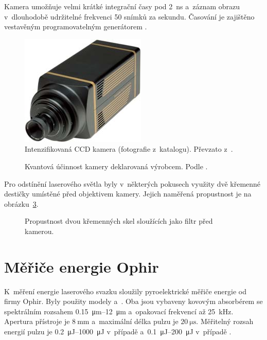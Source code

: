 Kamera umožňuje velmi krátké integrační časy pod \SI{2}{\nano\second}
a~záznam obrazu v~dlouhodobě udržitelné frekvenci 50 snímků za sekundu.
Časování je zajištěno vestavěným programovatelným generátorem .
\autocite{pimax-datasheet}

\begin{figure}[htp]
	\centering
	\includegraphics[scale=0.4]{img/pimax-1024}
	\caption{Intenzifikovaná CCD kamera 
		(fotografie z~katalogu).
		Převzato z~\cite{pimax-datasheet}.}
	\label{fig:instruments-camera}
\end{figure}

\begin{figure}[htp]
	\centering
	
	\caption{Kvantová účinnost kamery deklarovaná výrobcem.
		Podle \cite{pimax-datasheet}.}
	\label{fig:instruments-cameraeff}
\end{figure}

Pro odstínění laserového světla byly v~některých pokusech využity dvě
křemenné destičky umístěné před objektivem kamery.
Jejich naměřená propustnost je na obrázku~\ref{fig:instruments-camerafilter}.

\begin{figure}[htp]
	\centering
	
	\caption{Propustnost dvou křemenných skel sloužících jako filtr
		před kamerou.}
	\label{fig:instruments-camerafilter}
\end{figure}

\section{Měřiče energie Ophir}
\label{sec:instruments-powermeter}
K~měření energie laserového svazku sloužily pyroelektrické měřiče energie
od firmy Ophir.
Byly použity modely  a~.
Oba jsou vybaveny kovovým absorbérem se spektrálním rozsahem
\SIrange{0.15}{12}{\micro\metre}
a~opakovací frekvencí až \SI{25}{\kilo\hertz}.
Apertura přístroje je $\SI{8}{\milli\metre}$
a~maximální délka pulzu je $\SI{20}{\micro\second}$.
\autocites{pe9-datasheet,pe9esc-datasheet}
Měřitelný rozsah energií pulzu je \SIrange{0.2}{1000}{\micro\joule}
v~případě \autocite{pe9-datasheet}
a~\SIrange{0.1}{200}{\micro\joule} v~případě 
\autocite{pe9esc-datasheet}.

